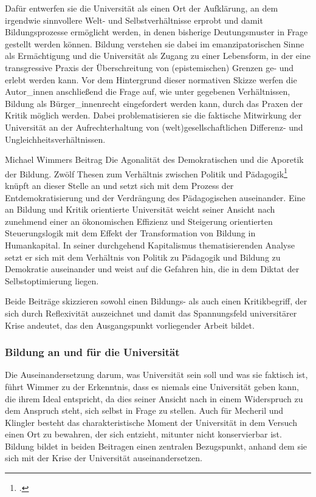 Dafür entwerfen sie die Universität als
einen Ort der Aufklärung, an dem \glqq irgendwie sinnvollere Welt- und
Selbstverhältnisse\grqq\footnotemark {} erprobt und damit Bildungsprozesse ermöglicht werden, in denen bisherige Deutungsmuster in Frage gestellt werden können. Bildung
verstehen sie dabei im emanzipatorischen Sinne als Ermächtigung und die
Universität als Zugang zu einer Lebensform, in der eine transgressive Praxis
der Überschreitung von (epistemischen) Grenzen ge- und erlebt werden kann. Vor
dem Hintergrund dieser normativen Skizze werfen die Autor\_innen anschließend
die Frage auf, wie unter gegebenen Verhältnissen, Bildung als Bürger\_innenrecht
eingefordert werden kann, durch das Praxen der Kritik möglich werden. Dabei
problematisieren sie die faktische Mitwirkung der Universität an der
Aufrechterhaltung von (welt)gesellschaftlichen Differenz- und
Ungleichheitsverhältnissen.

Michael Wimmers Beitrag \glqq Die Agonalität des
Demokratischen und die Aporetik der Bildung. Zwölf Thesen zum Verhältnis
zwischen Politik und Pädagogik\grqq\footnotemark \footcitetext{wimmer} knüpft
an dieser Stelle an und setzt sich mit dem Prozess der Entdemokratisierung und
der Verdrängung des Pädagogischen\footnotemark {} auseinander. Eine an Bildung und Kritik
orientierte Universität weicht seiner Ansicht nach zunehmend \glqq einer an
ökonomischen Effizienz und Steigerung orientierten Steuerungslogik\grqq\footnotemark {} mit dem
Effekt der Transformation von Bildung in Humankapital. In seiner durchgehend
Kapitalismus thematisierenden Analyse setzt er sich mit dem Verhältnis von
Politik zu Pädagogik und Bildung zu Demokratie auseinander und weist auf die
Gefahren hin, die in dem Diktat der Selbstoptimierung liegen.

Beide Beiträge skizzieren sowohl einen Bildungs- als auch einen Kritikbegriff, der sich durch
Reflexivität auszeichnet und damit das Spannungsfeld universitärer Krise
andeutet, das den Ausgangspunkt vorliegender Arbeit bildet. 

\subsubsection{Bildung an und für die Universität}

Die Auseinandersetzung darum, was Universität sein soll und was sie faktisch
ist, führt Wimmer zu der Erkenntnis, dass es niemals eine Universität geben
kann, die ihrem Ideal entspricht, da dies seiner Ansicht nach in einem
Widerspruch zu dem Anspruch steht, sich selbst in Frage zu
stellen.\footnotemark {} Auch für
Mecheril und Klingler besteht das charakteristische Moment der Universität in
dem Versuch einen Ort zu bewahren, \glqq der sich entzieht, mitunter nicht
konservierbar ist.\grqq\footnotemark {} Bildung bildet in beiden Beitragen einen zentralen
Bezugspunkt, anhand dem sie sich mit der Krise der Universität
auseinandersetzen.

